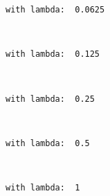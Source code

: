 \documentclass[11pt]{article}
\begin{document}
    \begin{Verbatim}[commandchars=\\\{\}]
     with lambda:  0.0625

    \end{Verbatim}

    \begin{center}
    \end{center}
    { \hspace*{\fill} \\}
    
    \begin{Verbatim}[commandchars=\\\{\}]
     with lambda:  0.125

    \end{Verbatim}

    \begin{center}
    \end{center}
    { \hspace*{\fill} \\}
    
    \begin{Verbatim}[commandchars=\\\{\}]
     with lambda:  0.25

    \end{Verbatim}

    \begin{center}
    \end{center}
    { \hspace*{\fill} \\}
    
    \begin{Verbatim}[commandchars=\\\{\}]
     with lambda:  0.5

    \end{Verbatim}

    \begin{center}
    \end{center}
    { \hspace*{\fill} \\}
    
    \begin{Verbatim}[commandchars=\\\{\}]
     with lambda:  1

    \end{Verbatim}
\end{document}

